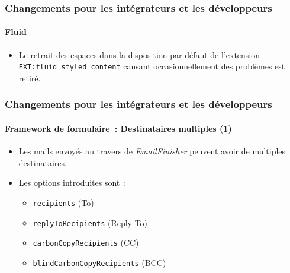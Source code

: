 
\begin{frame}[fragile]
	\frametitle{Changements pour les intégrateurs et les développeurs}
	\framesubtitle{Fluid}

	\begin{itemize}
		\item Le retrait des espaces dans la disposition par défaut de l'extension \texttt{EXT:fluid\_styled\_content}
			causant occasionnellement des problèmes est retiré.

	\end{itemize}

\end{frame}


\begin{frame}[fragile]
	\frametitle{Changements pour les intégrateurs et les développeurs}
	\framesubtitle{Framework de formulaire~: Destinataires multiples (1)}

	\begin{itemize}
		\item Les mails envoyés au travers de \textit{EmailFinisher} peuvent avoir de multiples destinataires.

		\item Les options introduites sont~:

			\begin{itemize}
				\item \texttt{recipients} (To)
				\item \texttt{replyToRecipients} (Reply-To)
				\item \texttt{carbonCopyRecipients} (CC)
				\item \texttt{blindCarbonCopyRecipients} (BCC)
			\end{itemize}

	\end{itemize}

\end{frame}


